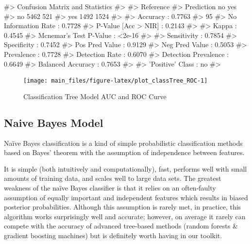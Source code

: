 \begin{Schunk}
\begin{Soutput}
#> Confusion Matrix and Statistics
#> 
#>           Reference
#> Prediction   no  yes
#>        no  5462  521
#>        yes 1492 1524
#>                                           
#>                Accuracy : 0.7763          
#>                  95%
#>     No Information Rate : 0.7728          
#>     P-Value [Acc > NIR] : 0.2143          
#>                                           
#>                   Kappa : 0.4545          
#>  Mcnemar's Test P-Value : <2e-16          
#>                                           
#>             Sensitivity : 0.7854          
#>             Specificity : 0.7452          
#>          Pos Pred Value : 0.9129          
#>          Neg Pred Value : 0.5053          
#>              Prevalence : 0.7728          
#>          Detection Rate : 0.6070          
#>    Detection Prevalence : 0.6649          
#>       Balanced Accuracy : 0.7653          
#>                                           
#>        'Positive' Class : no              
#> 
\end{Soutput}
\end{Schunk}

\begin{Schunk}
\begin{figure}[H]

{\centering \texttt{[image: main\_files/figure-latex/plot\_classTree\_ROC-1]} 

}

\caption[Classification Tree Model AUC and ROC Curve]{Classification Tree Model AUC and ROC Curve}\label{fig:plot_classTree_ROC}
\end{figure}
\end{Schunk}

\hypertarget{naive-bayes-model}{%
\subsection{Naive Bayes Model}\label{naive-bayes-model}}

Naïve Bayes classification is a kind of simple probabilistic
classification methods based on Bayes' theorem with the assumption of
independence between features.

It is simple (both intuitively and computationally), fast, performs well
with small amounts of training data, and scales well to large data sets.
The greatest weakness of the naïve Bayes classifier is that it relies on
an often-faulty assumption of equally important and independent features
which results in biased posterior probabilities. Although this
assumption is rarely met, in practice, this algorithm works surprisingly
well and accurate; however, on average it rarely can compete with the
accuracy of advanced tree-based methods (random forests \& gradient
boosting machines) but is definitely worth having in our toolkit.

